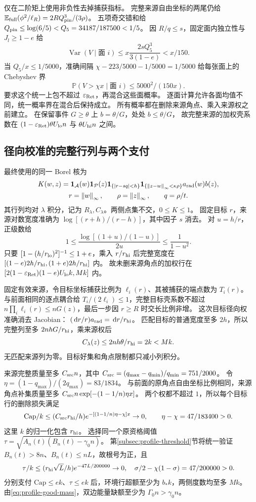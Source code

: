 \documentclass[UTF8,a4paper,11pt,fontset=fandol]{ctexart}
\theoremstyle{remark}
\newcommand{\one}{\mathbf 1}
\newcommand{\norm}[1]{\left\lVert#1\right\rVert}
\newcommand{\dint}{\,\mathrm d}
\begin{document}
仅在二阶矩上使用非负性去掉捕获指标。
完整来源自由坐标的两尾仍给 $\mathbb E_{\rm full}(\phi^2/\ell_R)=2RQ_{\rm pin}^3/(3\rho)$。
五项奇交错和给
$Q_{\rm pin}\le\log(6/5)<Q_5=34187/187500<1/5$。
因 $R/q\le s$，固定面内独立性与 $J_l\ge1-e$ 给
\[
 \operatorname{Var}(V\mid\text{面 }i)
 \le x\frac{2sQ_5^3}{3(1-e)}<x/150.
\]
当 $Q_5/x\le1/5000$，准确间隔
$\chi-223/5000-1/5000=1/5000$ 给每张面上的 Chebyshev 界
\[
 \mathbb P(V>\chi x\mid\text{面 }i)\le5000^2/(150x).
\]
要求这个统一上包不超过 $\varepsilon_{\rm Ret}$，再混合这些面概率。
逐面计算允许各面均值不同，统一概率界在混合后保持成立。
所有概率都在删除来源角点、乘入来源权之前建立。
在保留事件 $G\ge\theta$ 上 $b=\theta/G$，处处 $b\le\theta/G$，
故完整来源的加权壳系数在 $(1-\varepsilon_{\rm Ret})\theta U_{\rm lo}n$ 与 $\theta U_{\rm hi}n$ 之间。

\subsection{径向校准的完整行列与两个支付}\label{subsec:profile-degrees}
最终使用的同一 Borel 核为
\begin{gather*}
 K(w,z)=\one_{\mathcal A}(w)\one_{\mathcal P}(z)
 \one_{\{|r-sq|<h\}}\one_{\{\norm{z-w}_\infty<\kappa\rho\}}
 a_{\rm rad}(w)b(z),\\
 r=\norm w_\infty,\qquad\rho=\norm z_\infty,\qquad q=\rho/t.
\end{gather*}
其行列均对 $\lambda$ 积分，记为 $R_\lambda,C_\lambda$。两侧点集不交，$0\le K\le1$。
固定目标 $r$，来源对数宽度准确为 $\log[(r+h)/(r-h)]$，其中因子 $s$ 消去。
对 $u=h/r$，正级数给
\[
 1\le\frac{\log[(1+u)/(1-u)]}{2u}\le\frac1{1-u^2}.
\]
只要 $[1-(h/r_{\rm lo})^2]^{-1}\le1+e$，乘入 $r/r_{\rm hi}$ 后完整宽度在
$[(1-e)2h/r_{\rm hi},(1+e)2h/r_{\rm hi}]$ 内。
故未删来源角点的加权行在
$[2(1-\varepsilon_{\rm Ret})(1-e)U_{\rm lo}k,Mk]$ 内。

固定有效来源，令目标坐标捕获比例为 $\ell_i(r)$、其被捕获的端点数为 $T_i(r)$。
与前面相同的逐点耦合给 $T_i/(2\ell_i)\le1$，完整目标壳系数不超过
$n\prod_i\ell_i(r)\le nG(z)$，最后一步因 $r\ge R$ 时交长比例非增。
这次目标径向权准确消去 Jacobian：
$(\dint r/r)a_{\rm rad}=\dint r/r_{\rm hi}$。
匹配目标的普通宽度至多 $2h$，所以完整列至多 $2nhG/r_{\rm hi}$，乘来源权后
\[
 C_\lambda(z)\le2nh\theta/r_{\rm hi}=2k<Mk.
\]
无匹配来源列为零。目标好集和角点限制都只减小列积分。

来源完整质量至多 $C_{\rm src}n$，其中
$C_{\rm src}=(q_{\max}-q_{\min})/q_{\min}=751/2000$。
令 $\eta=(1-q_{\max})/(2q_{\max})=83/1834$。
与前面的原角点自由坐标比例相同，来源角点补集质量至多
$C_{\rm src}n\exp[-(1-1/n)\eta x]$。
两个权都不超过 $1$，所以每个目标行的删除损失满足
\[
 \mathrm{Cap}/k\le(C_{\rm src}r_{\rm hi}/h)
 e^{-[(1-1/n)\eta-\chi]x}\to0,\qquad\eta-\chi=47/183400>0.
\]
这里 $k$ 的归一化包含 $r_{\rm hi}$。
选择同一个原资格阈值 $\tau=\sqrt{A_n(t)(B_n(t)-\gamma_0n)}$。
第\ref{subsec:profile-threshold}节将统一验证 $B_n(t)>8n$、$B_n(t)\le nL$，故根号为正，且
\[
 \tau/k\le(r_{\rm hi}\sqrt L/h)e^{-47L/200000}\to0,
 \quad\sigma/2-\chi(1-\sigma)=47/200000>0.
\]
分别支付 $\mathrm{Cap}\le ek$、$\tau\le ek$ 后，环境行超额至少为 $b_*k$，两侧度数均至多 $Mk$。
由\eqref{eq:profile-good-mass}，双边能量缺额至少为 $\Gamma_0n>\gamma_0n$。
\end{document}
